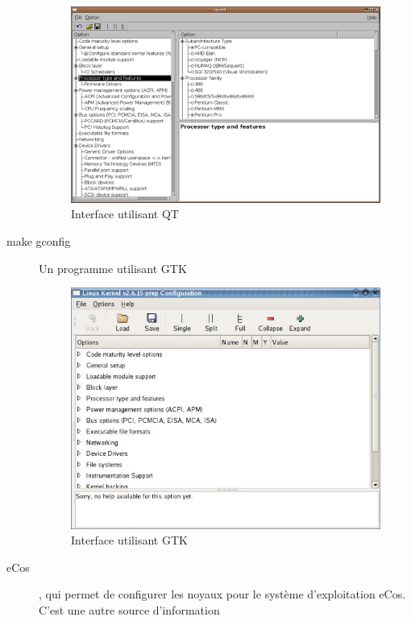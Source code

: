 \documentclass[17pts]{report}
\begin{document}
\begin{description}
\begin{figure}[H]
            \includegraphics[scale=0.4]{illustrations/xconfig.png}
            \centering
            \caption{Interface utilisant QT}
            \label{fig:MakeXconfig}
        \end{figure}
        \pagebreak
\item[make gconfig]             Un programme utilisant GTK \\
        \begin{figure}[H]
            \includegraphics[scale=0.9]{illustrations/gconfig.jpg}
            \centering
            \caption{Interface utilisant GTK}
            \label{fig:MakeGconfig}
        \end{figure}
    \item[eCos], qui permet de configurer les noyaux pour le système
        d’exploitation eCos. C’est une autre source d’information

\end{description}
\end{document}
